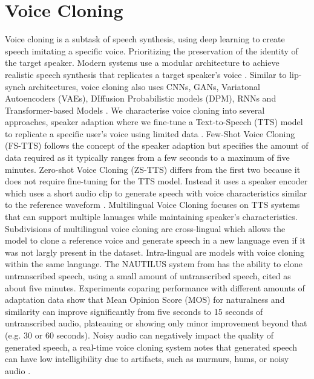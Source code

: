\documentclass[12pt]{article}
\begin{document}
\section{Voice Cloning}
Voice cloning is a subtask of speech synthesis, using deep learning to create speech imitating a specific voice. Prioritizing the preservation of the identity of the target speaker. Modern systems use a modular architecture to achieve realistic speech synthesis that replicates a target speaker's voice \cite{Real-time_voice_cloning_system}. Similar to lip-synch architectures, voice cloning also uses CNNs, GANs, Variatonal Autoencoders (VAEs), DIffusion Probabilistic models (DPM), RNNs and Transformer-based Models \cite{voice-cloning-survey}. We characterise voice cloning into several approaches, speaker adaption where we fine-tune a Text-to-Speech (TTS) model to replicate a specific user's voice using limited data \cite{voice-cloning-survey}. Few-Shot Voice Cloning (FS-TTS) follows the concept of the speaker adaption but specifies the amount of data required as it typically ranges from a few seconds to a maximum of five minutes. Zero-shot Voice Cloning (ZS-TTS) differs from the first two because it does not require fine-tuning for the TTS model. Instead it uses a speaker encoder which uses a short audio clip to generate speech with voice characteristics similar to the reference waveform \cite{voice-cloning-survey}. Multilingual Voice Cloning focuses on TTS systems that can support multiple lanuages while maintaining speaker's characteristics. Subdivisions of multilingual voice cloning are cross-lingual which allows the model to clone a reference voice and generate speech in a new language even if it was not largly present in the dataset. Intra-lingual are models with voice cloning within the same language. The NAUTILUS system from \cite{NAUTILUS} has the ability to clone untranscribed speech, using a small amount of untranscribed speech, cited as about five minutes. Experiments coparing performance with different amounts of adaptation data show that Mean Opinion Score (MOS) for naturalness and similarity can improve significantly from five seconds to 15 seconds of untranscribed audio, plateauing or showing only minor improvement beyond that (e.g. 30 or 60 seconds)\cite{Unified_system_for_Voice_Cloning_and_Voice_Conversion}. Noisy audio can negatively impact the quality of generated speech, a real-time voice cloning system notes that generated speech can have low intelligibility due to artifacts, such as murmurs, hums, or noisy audio \cite{Real-time_voice_cloning_system}. 
\end{document}
